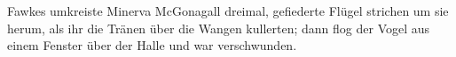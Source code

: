 Fawkes umkreiste Minerva McGonagall dreimal, gefiederte Flügel strichen um sie herum, als ihr die Tränen über die Wangen kullerten; dann flog der Vogel aus einem Fenster über der Halle und war verschwunden.

